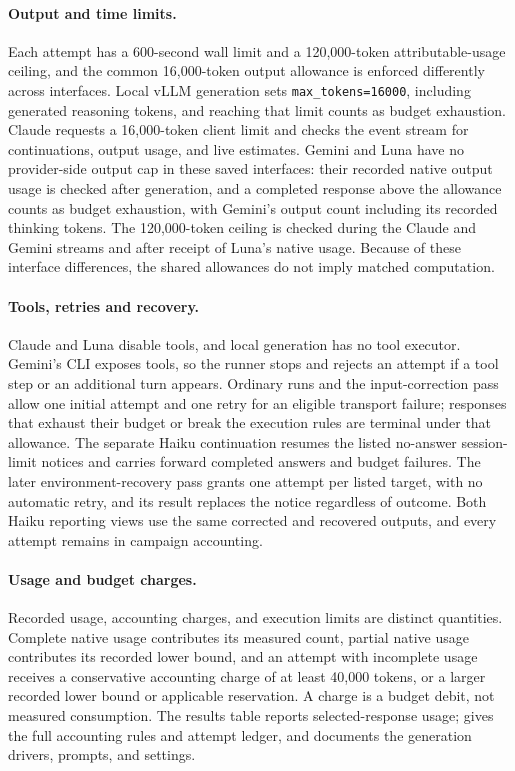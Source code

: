 \paragraph{Output and time limits.}
Each attempt has a 600-second wall limit and a 120,000-token attributable-usage ceiling, and the common 16,000-token output allowance is enforced differently across interfaces. Local vLLM generation sets \texttt{max\_tokens=16000}, including generated reasoning tokens, and reaching that limit counts as budget exhaustion. Claude requests a 16,000-token client limit and checks the event stream for continuations, output usage, and live estimates. Gemini and Luna have no provider-side output cap in these saved interfaces: their recorded native output usage is checked after generation, and a completed response above the allowance counts as budget exhaustion, with Gemini's output count including its recorded thinking tokens. The 120,000-token ceiling is checked during the Claude and Gemini streams and after receipt of Luna's native usage. Because of these interface differences, the shared allowances do not imply matched computation.

\paragraph{Tools, retries and recovery.}
Claude and Luna disable tools, and local generation has no tool executor. Gemini's CLI exposes tools, so the runner stops and rejects an attempt if a tool step or an additional turn appears. Ordinary runs and the input-correction pass allow one initial attempt and one retry for an eligible transport failure; responses that exhaust their budget or break the execution rules are terminal under that allowance. The separate Haiku continuation resumes the listed no-answer session-limit notices and carries forward completed answers and budget failures. The later environment-recovery pass grants one attempt per listed target, with no automatic retry, and its result replaces the notice regardless of outcome. Both Haiku reporting views use the same corrected and recovered outputs, and every attempt remains in campaign accounting.

\paragraph{Usage and budget charges.}
Recorded usage, accounting charges, and execution limits are distinct quantities. Complete native usage contributes its measured count, partial native usage contributes its recorded lower bound, and an attempt with incomplete usage receives a conservative accounting charge of at least 40,000 tokens, or a larger recorded lower bound or applicable reservation. A charge is a budget debit, not measured consumption. The results table reports selected-response usage;  gives the full accounting rules and attempt ledger, and  documents the generation drivers, prompts, and settings.

